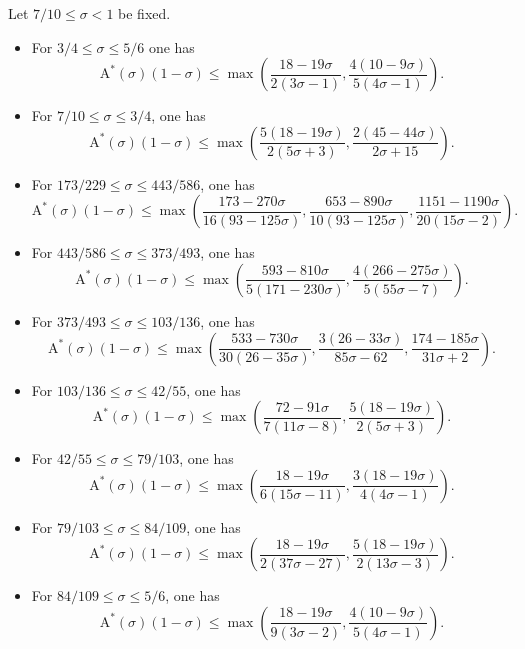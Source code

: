\documentclass[a4paper, 10pt]{amsart}
\newcommand{\A}{\mathrm{A}}
\begin{document}
\begin{theorem}\label{Add-est}  Let $7/10 \leq \sigma < 1$ be fixed.
    \begin{itemize}
    \item[(i)] For $3/4 \le \sigma \le 5/6$ one has
    \[
    \A^*(\sigma)(1-\sigma) \le \max\left(\frac{18 - 19\sigma}{2(3\sigma - 1)}, \frac{4(10 - 9\sigma)}{5(4\sigma - 1)}\right).
    \]
    \item[(ii)] For $7/10 \le \sigma \le 3/4$, one has
    \[
    \A^*(\sigma)(1-\sigma) \le \max\left(\frac{5(18 - 19\sigma)}{2(5\sigma + 3)}, \frac{2(45 - 44\sigma)}{2\sigma + 15}\right).
    \]
    \item[(iii)] For $173/229 \le \sigma \le 443/586$, one has 
    \[
    \A^*(\sigma)(1-\sigma) \le \max\left(\frac{173 - 270\sigma}{16(93 - 125\sigma)}, \frac{653 - 890\sigma}{10(93 - 125\sigma)}, \frac{1151 - 1190\sigma}{20(15\sigma - 2)}\right).
    \]
    \item[(iv)] For $443/586 \le \sigma \le 373/493$, one has
    \[
    \A^*(\sigma)(1-\sigma) \le \max\left(\frac{593 - 810\sigma}{5(171 - 230\sigma)}, \frac{4(266 - 275\sigma)}{5(55\sigma - 7)}\right).
    \]
    \item[(v)] For $373/493 \le \sigma \le 103/136$, one has
    \[
    \A^*(\sigma)(1-\sigma) \le \max\left(\frac{533 - 730\sigma}{30(26 - 35\sigma)}, \frac{3(26 - 33\sigma)}{85\sigma - 62}, \frac{174 - 185\sigma}{31\sigma + 2}\right).
    \]
    \item[(vi)] For $103/136 \le \sigma \le 42/55$, one has
    \[
    \A^*(\sigma)(1-\sigma) \le \max\left(\frac{72 - 91\sigma}{7(11\sigma - 8)}, \frac{5(18 - 19\sigma)}{2(5\sigma + 3)}\right).
    \]
    \item[(vii)] For $42/55 \le \sigma \le 79/103$, one has
    \[
    \A^*(\sigma)(1-\sigma) \le \max\left(\frac{18 - 19\sigma}{6(15\sigma - 11)}, \frac{3(18-19\sigma)}{4(4\sigma-1)}\right).
    \]
    \item[(viii)] For $79/103 \le \sigma \le 84/109$, one has
    \[
    \A^*(\sigma)(1-\sigma) \le \max\left(\frac{18 - 19\sigma}{2(37\sigma - 27)}, \frac{5(18 - 19\sigma)}{2(13\sigma - 3)}\right).
    \]
    \item[(ix)] For $84/109 \le \sigma \le 5/6$, one has
    \[
    \A^*(\sigma)(1-\sigma) \le \max\left(\frac{18 - 19\sigma}{9(3\sigma - 2)}, \frac{4(10 - 9\sigma)}{5(4\sigma - 1)}\right).
    \]
    \end{itemize}
\end{theorem}
\end{document}
